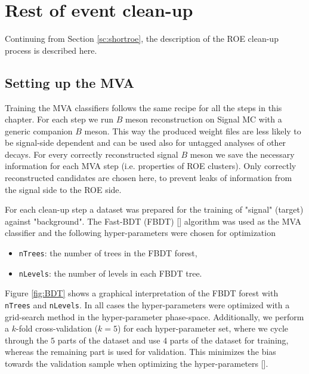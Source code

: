 \documentclass[  headings=standardclasses,
  headings=big,oneside,a4paper,openany,12pt]{scrbook}
\begin{document}
\chapter{Rest of event clean-up}
\label{ch:roe}

Continuing from Section \ref{sc:shortroe}, the description of the ROE clean-up process is described here. 

\section{Setting up the MVA}

Training the MVA classifiers follows the same recipe for all the steps in this chapter. For each step we run $B$ meson reconstruction on Signal MC with a generic companion $B$ meson. This way the produced weight files are less likely to be signal-side dependent and can be used also for untagged analyses of other decays. For every correctly reconstructed signal $B$ meson we save the necessary information for each MVA step (i.e. properties of ROE clusters). Only correctly reconstructed candidates are chosen here, to prevent leaks of information from the signal side to the ROE side.

For each clean-up step a dataset was prepared for the training of "signal" (target) against "background". The Fast-BDT (FBDT) [] algorithm was used as the MVA classifier and the following hyper-parameters were chosen for optimization
\begin{itemize}
\item \texttt{nTrees}: the number of trees in the FBDT forest,
\item \texttt{nLevels}: the number of levels in each FBDT tree.
\end{itemize}

Figure \ref{fig:BDT} shows a graphical interpretation of the FBDT forest with \texttt{nTrees} and \texttt{nLevels}. In all cases the hyper-parameters were optimized with a grid-search method in the hyper-parameter phase-space. Additionally, we perform a $k$-fold cross-validation ($k=5$) for each hyper-parameter set, where we cycle through the $5$ parts of the dataset and use $4$ parts of the dataset for training, whereas the remaining part is used for validation. This minimizes the bias towards the validation sample when optimizing the hyper-parameters [].
\end{document}

